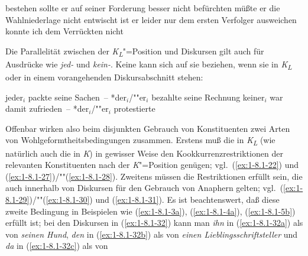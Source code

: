 \documentclass[output=paper]{langsci/langscibook}
\begin{document}
\begin{exe}
\ex\label{ex:1-8.1-30}
\begin{xlist}
\ex\label{ex:1-8.1-30a} bestehen sollte er auf seiner Forderung besser nicht
\ex\label{ex:1-8.1-30b} befürchten müßte er die Wahlniederlage nicht
\ex\label{ex:1-8.1-30c} entwischt ist er leider nur dem ersten Verfolger
\ex\label{ex:1-8.1-30d} ausweichen konnte ich dem Verrückten nicht
\end{xlist}
\end{exe}
Die Parallelität zwischen der \textit{K\textsubscript{L}}"=Position und Diskursen gilt auch \zb für Ausdrücke
wie \textit{jed-} und \textit{kein-}. Keine  kann sich auf sie beziehen, wenn sie in \textit{K\textsubscript{L}} oder in
einem vorangehenden Diskursabschnitt stehen:
\begin{exe}
\ex\label{ex:1-8.1-31}
\begin{xlist}
\ex\label{ex:1-8.1-31i}
\begin{xlist}
\ex\label{ex:1-8.1-31ia} jeder$_i$ packte seine Sachen~– *der$_i$/""er$_i$ bezahlte seine Rechnung
\ex\label{ex:1-8.1-31ib} keiner$_i$ war damit zufrieden~– *der$_i$/""er$_i$ protestierte
\end{xlist}
\ex\label{ex:1-8.1-31ii}
\begin{xlist}
\end{xlist}
\end{xlist}
\end{exe}
Offenbar wirken also beim disjunkten Gebrauch von Konstituenten zwei Arten von
Wohlgeformtheitsbedingungen zusammen. Erstens muß die  in \textit{K\textsubscript{L}} (wie natürlich auch die in \textit{K}) in gewisser Weise den Kookkurrenzrestriktionen der relevanten Konstituenten nach der \textit{K}"=Position genügen; vgl.\ (\ref{ex:1-8.1-22}) und (\ref{ex:1-8.1-27})/""(\ref{ex:1-8.1-28}). Zweitens
müssen die Restriktionen erfüllt sein, die auch innerhalb von Diskursen für den Gebrauch von Anaphern gelten; vgl.\ (\ref{ex:1-8.1-29})/""(\ref{ex:1-8.1-30}) und (\ref{ex:1-8.1-31}). Es ist beachtenswert, daß diese zweite Bedingung in Beispielen wie (\ref{ex:1-8.1-3a}), (\ref{ex:1-8.1-4a}), (\ref{ex:1-8.1-5b}) erfüllt ist; bei den Diskursen in
(\ref{ex:1-8.1-32}) kann man \textit{ihn} in (\ref{ex:1-8.1-32a}) als  von \textit{seinen Hund}, \textit{den} in (\ref{ex:1-8.1-32b}) als 
von \textit{einen Lieblingsschriftsteller} und \textit{da} in (\ref{ex:1-8.1-32c}) als  von
\end{document}
